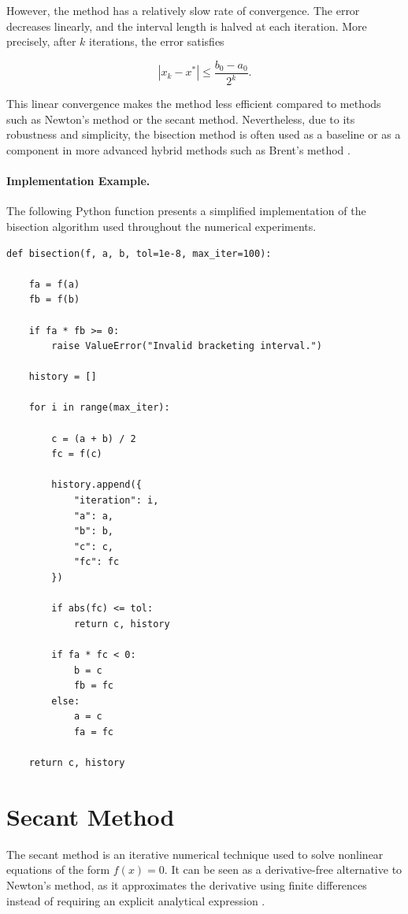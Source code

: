 However, the method has a relatively slow rate of convergence. The error decreases linearly, and the interval length is halved at each iteration. More precisely, after \( k \) iterations, the error satisfies

\begin{equation}
|x_k - x^*| \leq \frac{b_0 - a_0}{2^k}.
\end{equation}

This linear convergence makes the method less efficient compared to methods such as Newton's method or the secant method. Nevertheless, due to its robustness and simplicity, the bisection method is often used as a baseline or as a component in more advanced hybrid methods such as Brent's method \cite{atkinson, cs357}.

\paragraph{Implementation Example.}

The following Python function presents a simplified implementation of the bisection algorithm used throughout the numerical experiments.

\begin{lstlisting}
def bisection(f, a, b, tol=1e-8, max_iter=100):

    fa = f(a)
    fb = f(b)

    if fa * fb >= 0:
        raise ValueError("Invalid bracketing interval.")

    history = []

    for i in range(max_iter):

        c = (a + b) / 2
        fc = f(c)

        history.append({
            "iteration": i,
            "a": a,
            "b": b,
            "c": c,
            "fc": fc
        })

        if abs(fc) <= tol:
            return c, history

        if fa * fc < 0:
            b = c
            fb = fc
        else:
            a = c
            fa = fc

    return c, history
\end{lstlisting}

\section{Secant Method}

The secant method is an iterative numerical technique used to solve nonlinear equations of the form \( f(x) = 0 \). It can be seen as a derivative-free alternative to Newton's method, as it approximates the derivative using finite differences instead of requiring an explicit analytical expression \cite{burden, atkinson}.

